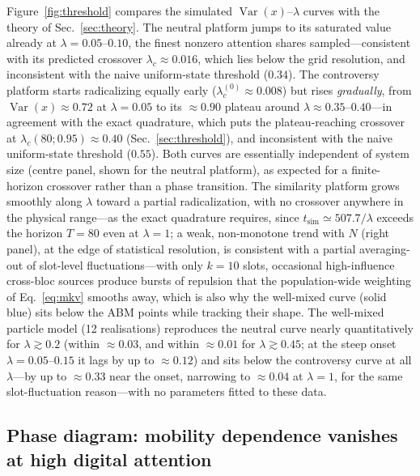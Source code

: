 \documentclass[5p,times,twocolumn]{elsarticle}
\begin{document}
Figure~\ref{fig:threshold} compares the simulated
$\operatorname{Var}(x)$--$\lambda$ curves with the theory of
Sec.~\ref{sec:theory}. The neutral platform jumps to its saturated value
already at $\lambda = 0.05$--$0.10$, the finest nonzero attention shares
sampled---consistent with its predicted crossover
$\lambda_c \approx 0.016$, which lies below the grid resolution, and
inconsistent with the naive uniform-state threshold ($0.34$). The
controversy platform starts radicalizing equally early
($\lambda_c^{(0)} \approx 0.008$) but rises \emph{gradually}, from
$\operatorname{Var}(x) \approx 0.72$ at $\lambda = 0.05$ to its
$\approx 0.90$ plateau around $\lambda \approx 0.35$--$0.40$---in
agreement with the exact quadrature, which puts the plateau-reaching
crossover at $\lambda_c(80; 0.95) \approx 0.40$
(Sec.~\ref{sec:threshold}), and inconsistent with the naive uniform-state
threshold ($0.55$). Both curves are essentially independent of
system size (centre panel, shown for the neutral platform), as expected
for a finite-horizon crossover
rather than a phase transition. The similarity platform grows smoothly
along $\lambda$ toward a partial radicalization, with no crossover
anywhere in the physical range---as the exact quadrature requires, since
$t_{\mathrm{sim}} \simeq 507.7/\lambda$ exceeds the horizon $T = 80$ even
at $\lambda = 1$; a
weak, non-monotone trend with $N$ (right panel), at the edge of
statistical resolution, is consistent with a partial averaging-out of
slot-level fluctuations---with only $k = 10$ slots, occasional
high-influence cross-bloc sources produce bursts of repulsion that the
population-wide weighting of Eq.~\eqref{eq:mkv} smooths away, which is
also why the well-mixed curve (solid blue) sits below the ABM points
while tracking their shape. The well-mixed particle model (12
realisations) reproduces the neutral curve nearly quantitatively for
$\lambda \gtrsim 0.2$ (within $\approx 0.03$, and within $\approx 0.01$
for $\lambda \gtrsim 0.45$; at the steep onset $\lambda = 0.05$--$0.15$
it lags by up to $\approx 0.12$) and sits below the controversy curve at
all $\lambda$---by up to $\approx 0.33$ near the onset, narrowing to
$\approx 0.04$ at $\lambda = 1$, for the same slot-fluctuation
reason---with no parameters fitted to these data.

\subsection{Phase diagram: mobility dependence vanishes at high digital
attention}
\label{sec:phase}
\end{document}
